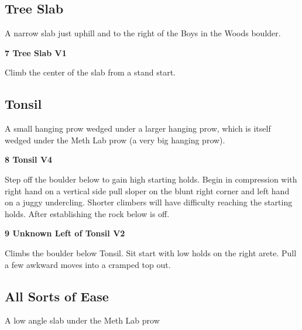 \begin{multicols}{2}
			\subsection*{Tree Slab}\label{bf:Tree Slab}
			\begin{minipage}{\columnwidth}
			A narrow slab just uphill and to the right of the Boys in the Woods boulder.
			\end{minipage}
			
					\begin{minipage}{\linewidth}	
					\label{rt:Tree Slab}\colorbox{green!20}{\textbf{7 Tree Slab V1 \ding{72}   }}
					\begin{adjustwidth}{0.5cm}{}				
					Climb the center of the slab from a stand start.
					\end{adjustwidth}
					\end{minipage}
			\subsection*{Tonsil}\label{bf:Tonsil}
			\begin{minipage}{\columnwidth}
			A small hanging prow wedged under a larger hanging prow, which is itself wedged under the Meth Lab prow (a very big hanging prow).
			\end{minipage}
			
					\begin{minipage}{\linewidth}	
					\label{rt:Tonsil}\colorbox{RoyalBlue!20}{\textbf{8 Tonsil V4    }}
					\begin{adjustwidth}{0.5cm}{}				
					Step off the boulder below to gain high starting holds. Begin in compression with right hand on a vertical side pull sloper on the blunt right corner and left hand on a juggy undercling.  Shorter climbers will have difficulty reaching the starting holds. After establishing the rock below is off.
					\end{adjustwidth}
					\end{minipage}
					\begin{minipage}{\linewidth}	
					\label{rt:Unknown Left of Tonsil}\colorbox{green!20}{\textbf{9 Unknown Left of Tonsil V2 \ding{73} }}
					\begin{adjustwidth}{0.5cm}{}				
					Climbs the boulder below Tonsil. Sit start with low holds on the right arete. Pull a few awkward moves into a cramped top out.
					\end{adjustwidth}
					\end{minipage}
			\subsection*{All Sorts of Ease}\label{bf:All Sorts of Ease}
			\begin{minipage}{\columnwidth}
			A low angle slab under the Meth Lab prow
			\end{minipage}
			

\end{multicols}
